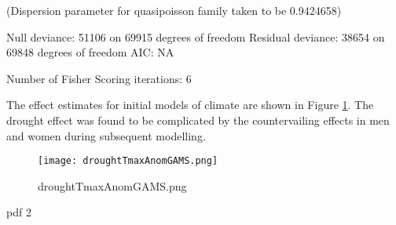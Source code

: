 \documentclass[a4paper]{article}                %
\begin{document}
\begin{Schunk}
\begin{Soutput}
(Dispersion parameter for quasipoisson family taken to be 0.9424658)

    Null deviance: 51106  on 69915  degrees of freedom
Residual deviance: 38654  on 69848  degrees of freedom
AIC: NA

Number of Fisher Scoring iterations: 6
\end{Soutput}
\end{Schunk}


        The effect estimates for initial models of climate are shown in Figure \ref{fig:droughtTmaxAnomGAMS.png}.  The drought effect was found to be complicated by the countervailing effects in men and women during subsequent modelling.
        \begin{figure}[!h]
        \centering
        \texttt{[image: droughtTmaxAnomGAMS.png]}
        \caption{droughtTmaxAnomGAMS.png}
        \label{fig:droughtTmaxAnomGAMS.png}
        \end{figure}
        \clearpage


\begin{Schunk}
\begin{Soutput}
pdf 
  2 
\end{Soutput}
\end{Schunk}

\end{document}

